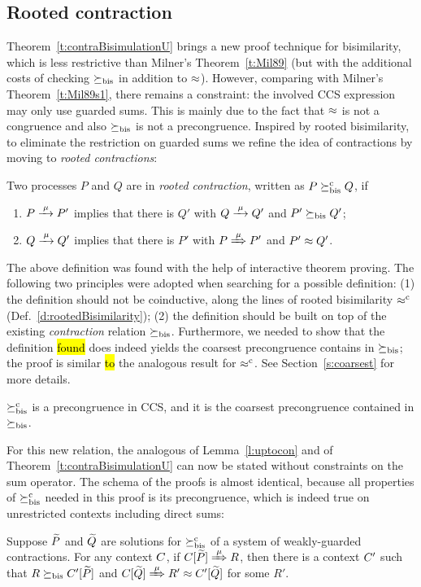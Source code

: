 \subsection{Rooted contraction}
\label{ss:new}

Theorem~\ref{t:contraBisimulationU} brings a new proof technique for
bisimilarity, which is  less restrictive than Milner's
Theorem~\ref{t:Mil89} (but with the additional costs of checking $\mathrel{\succeq_{\rm{bis}}}$
in addition to $\approx$).
However, comparing with Milner's Theorem~\ref{t:Mil89s1}, there remains
a constraint: the involved CCS expression may only
use guarded sums. This is mainly due to the fact that $\approx$ is not a
 congruence and also $\mathrel{\succeq_{\rm{bis}}}$ is not a  precongruence.
Inspired by rooted bisimilarity, to  eliminate the restriction
on guarded sums we refine the idea of contractions by moving
to \emph{rooted contractions}:

\begin{definition}
\label{d:rcontra}
Two processes $P$ and $Q$ are in \emph{rooted contraction}, written as
 $P\mathrel{\succeq^{\rm{c}}_{\rm{bis}}} Q$, if
\begin{enumerate}
\item $P \arr\mu P'$ implies that there is $Q'$ with $Q \arr \mu Q'$
 and $P'\mathrel{\succeq_{\rm{bis}}} Q'$;
\item $Q \arr\mu Q'$   implies that there is $P'$ with $P \Arr \mu
 P'$ and $P' \approx Q'$\enspace.
\end{enumerate}
\end{definition}

The above definition was found with the help of interactive theorem proving.
The following two principles were adopted when searching
for a possible definition: (1) the definition should not be coinductive,
along the lines of rooted bisimilarity $\mathrel{\approx^{\rm{c}}}$ (Def.~\ref{d:rootedBisimilarity});
(2) the definition should be built on top of  the existing \emph{contraction}
relation $\mathrel{\succeq_{\rm{bis}}}$.
Furthermore, we needed to show that the  definition \hl{found} 
does indeed yields the coarsest precongruence
contains in $\mathrel{\succeq_{\rm{bis}}}$; the proof is similar \hl{to}
the analogous result for $\mathrel{\approx^{\rm{c}}}$. See Section~\ref{s:coarsest} for
more details.

\begin{theorem}
\label{t:rcontrPrecongruence}
$\mathrel{\succeq^{\rm{c}}_{\rm{bis}}}$ is a precongruence in CCS, and it is the coarsest
precongruence contained in $\mathrel{\succeq_{\rm{bis}}}$.
\end{theorem}  

For this new relation, the analogous of Lemma~\ref{l:uptocon} and of
Theorem~\ref{t:contraBisimulationU} can now be stated without
constraints on the sum operator.
The schema of the proofs is almost identical, because all 
properties of $\mathrel{\succeq^{\rm{c}}_{\rm{bis}}}$ needed in this proof is its precongruence, which is
indeed true on unrestricted contexts including direct sums:
\begin{lemma}
\label{l:ruptocon}
Suppose $\widetilde P$ and $\widetilde Q$ are solutions  for $\mathrel{\succeq^{\rm{c}}_{\rm{bis}}}$ 
 of a system of weakly-guarded contractions.
For any context $C$, 
if  $\ct{\til P}\Arr{\mu}  R$,
 then there is a context $C'$
such that $R \mathrel{\succeq_{\rm{bis}}} C' [\widetilde P]$ and  $\ct{\til Q} \Arr{\mu} R'
 \wb \ctp{\til Q}$ for some $R'$.
\end{lemma}

